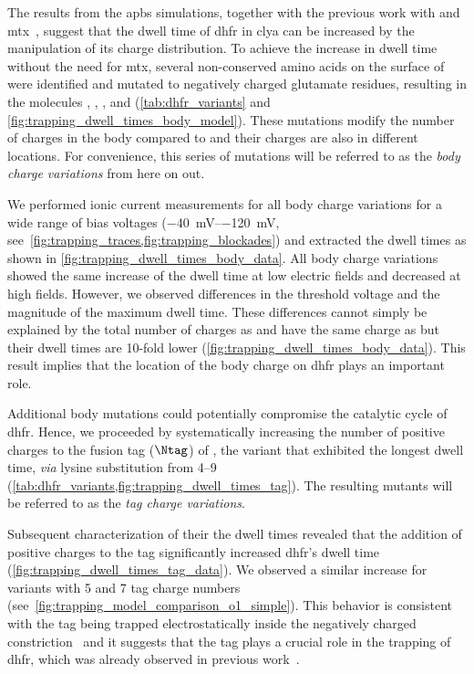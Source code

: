 The results from the \gls{apbs} simulations, together with the previous work with \DHFRt{} and
\gls{mtx}~\cite{Soskine-Biesemans-2015}, suggest that the dwell time of \gls{dhfr} in \gls{clya} can be
increased by the manipulation of its charge distribution. To achieve the increase in dwell time without the
need for \gls{mtx}, several non-conserved amino acids on the surface of  were identified and
mutated to negatively charged glutamate residues, resulting in the molecules , ,
, and  (\cref{tab:dhfr_variants} and \cref{fig:trapping_dwell_times_body_model}).
These mutations modify the number of charges in the body compared to  and their charges are also in
different locations. For convenience, this series of mutations will be referred to as the \emph{body charge
variations} from here on out.

We performed ionic current measurements for all body charge variations for a wide range of bias voltages
(\SIrange{-40}{-120}{\mV}, see~\cref{fig:trapping_traces,fig:trapping_blockades}) and extracted the dwell
times as shown in \cref{fig:trapping_dwell_times_body_data}. All body charge variations showed the same
increase of the dwell time at low electric fields and decreased at high fields. However, we observed
differences in the threshold voltage and the magnitude of the maximum dwell time. These differences cannot
simply be explained by the total number of charges as  and  have the same charge as
 but their dwell times are 10-fold lower (\cref{fig:trapping_dwell_times_body_data}). This result
implies that the location of the body charge on \gls{dhfr} plays an important role.

Additional body mutations could potentially compromise the catalytic cycle of \gls{dhfr}\@. Hence, we
proceeded by systematically increasing the number of positive charges to the fusion tag ($\Ntag$) of
, the variant that exhibited the longest dwell time, \textit{via} lysine substitution from
\SIrange{+4}{+9}{\ec} (\cref{tab:dhfr_variants,fig:trapping_dwell_times_tag}). The resulting
 mutants  will be referred to as the \emph{tag charge variations}.

Subsequent characterization of their the dwell times revealed that the addition of positive charges to the tag
significantly increased \gls{dhfr}'s dwell time (\cref{fig:trapping_dwell_times_tag_data}). We observed a
similar increase for  variants with \num{+5} and \num{+7} tag charge numbers
(see~\cref{fig:trapping_model_comparison_o1_simple}). This behavior is consistent with the tag being trapped
electrostatically inside the negatively charged \transi{}
constriction~\cite{Franceschini-2016,Movileanu-2005,Asandei-2015,Asandei-2016} and it suggests that the tag
plays a crucial role in the trapping of \gls{dhfr}, which was already observed in previous
work~\cite{Soskine-Biesemans-2015}.

